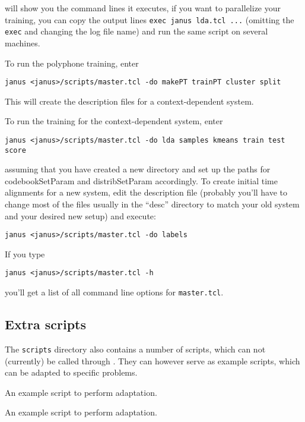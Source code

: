  will show you the  command lines it executes,
if you want   to parallelize your  training, you  can copy  the output
lines   {\tt exec  janus lda.tcl   ...} (omitting  the  {\tt exec} and
changing the   log  file name) and  run   the same  script  on several
machines.

To run the polyphone training, enter

\begin{verbatim}
janus <janus>/scripts/master.tcl -do makePT trainPT cluster split
\end{verbatim}

This will create the description files for a context-dependent system.

To run the training for the context-dependent system, enter

\begin{verbatim}
janus <janus>/scripts/master.tcl -do lda samples kmeans train test score
\end{verbatim}

assuming  that you have created  a new directory  and set up the paths
for codebookSetParam and distribSetParam accordingly. To create initial
time alignments for a new system, edit the description file (probably
you'll have to change most of the files usually in the ``desc'' directory
to match your old system and your desired new setup) and execute:

\begin{verbatim}
janus <janus>/scripts/master.tcl -do labels
\end{verbatim}

If you type

\begin{verbatim}
janus <janus>/scripts/master.tcl -h
\end{verbatim}

you'll get a list of all command line options for \texttt{master.tcl}.

\subsection{Extra scripts} \label{janus:extrascripts}

The   \texttt{scripts} directory  also  contains a  number of scripts,
which    can       not     (currently)    be       called      through
. They  can however  serve as  example scripts,
which can be adapted to specific problems.

\begin{description}

 \label{janus:map.tcl}

An example script to perform  adaptation.

 \label{janus:mllr.tcl}

An example script to perform  adaptation.

\end{description}

